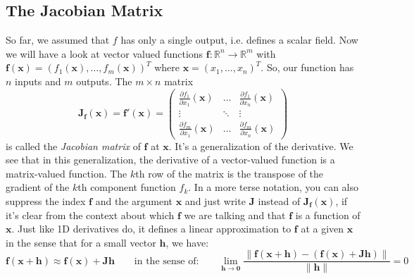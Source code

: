 \subsection{The Jacobian Matrix}
So far, we assumed that $f$ has only a single output, i.e. defines a scalar field. Now we will have a look at vector valued functions $\mathbf{f}: \mathbb{R}^n \rightarrow \mathbb{R}^m$ with $\mathbf{f(x)} = (f_1(\mathbf{x}), \ldots, f_m(\mathbf{x}))^T$ where $\mathbf{x} = (x_1,\ldots,x_n)^T$. So, our function has $n$ inputs and $m$ outputs. The $m \times n$ matrix
\begin{equation}
 \mathbf{J_f}(\mathbf{x}) = 
 \mathbf{f'}(\mathbf{x}) = 
 \begin{pmatrix}
  \frac{\partial f_1}{\partial x_1} (\mathbf{x}) & \hdots & \frac{\partial f_1}{\partial x_n} (\mathbf{x}) \\
  \vdots & \ddots & \vdots \\
  \frac{\partial f_m}{\partial x_1} (\mathbf{x}) & \hdots & \frac{\partial f_m}{\partial x_n} (\mathbf{x})
 \end{pmatrix}
\end{equation}	
is called the \emph{Jacobian matrix} of $\mathbf{f}$ at $\mathbf{x}$. It's a generalization of the derivative. We see that in this generalization, the derivative of a vector-valued function is a matrix-valued function. The $k$th row of the matrix is the transpose of the gradient of the $k$th component function $f_k$. In a more terse notation, you can also suppress the index $\mathbf{f}$ and the argument $\mathbf{x}$ and just write $\mathbf{J}$ instead of $\mathbf{J_f}(\mathbf{x})$, if it's clear from the context about which $\mathbf{f}$ we are talking and that $\mathbf{f}$ is a function of $\mathbf{x}$. Just like 1D derivatives do, it defines a linear approximation to $\mathbf{f}$ at a given $\mathbf{x}$ in the sense that for a small vector  $\mathbf{h}$, we have:
\begin{equation}
\label{Eq:JacobianApproximation}
 \mathbf{f}(\mathbf{x + h}) \approx 
 \mathbf{f}(\mathbf{x}) + \mathbf{J  h} \qquad \text{in the sense of:}  \qquad
 \lim_{\mathbf{h \rightarrow 0}} 
 \frac{\lVert \mathbf{f(x+h) - (f(x) + J h)} \rVert}
 {\lVert \mathbf{h} \rVert} = 0
\end{equation}	
